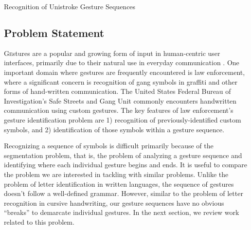 \documentclass[twoside]{article}
\begin{document}
\centerline{Recognition of Unistroke Gesture Sequences}
\normalsize


\begin{multicols}{2} %

\section{Problem Statement}
\lettrine[nindent=0em,lines=2]{G}estures are a popular and growing form of input
in human-centric user interfaces, primarily due to their natural use in everyday
communication \cite{mitra_gesture_2007}.
One important domain where gestures are frequently encountered is law
enforcement, where a significant concern is recognition of gang symbols in
graffiti and other forms of hand-written communication. The United States
Federal Bureau of Investigation's Safe Streets and Gang Unit commonly encounters
handwritten communication using custom
gestures\cite{lyddane_donald_united_2006}. The key features of law enforcement's
gesture identification problem are 1) recognition of previously-identified
custom symbols, and 2) identification of those symbols within a gesture
sequence.

Recognizing a sequence of symbols is difficult primarily because of the
segmentation problem, that is, the problem of analyzing a gesture sequence and
identifying where each individual gesture begins and ends.
It is useful to compare the problem we are interested in tackling with similar
problems. Unlike the problem of letter identification in written languages, the sequence
of gestures doesn't follow a well-defined grammar. However, similar to the
problem of letter recognition in cursive handwriting, our gesture sequences have
no obvious ``breaks'' to demarcate individual gestures. In the next section, we
review work related to this problem.



\end{multicols}
\end{document}
